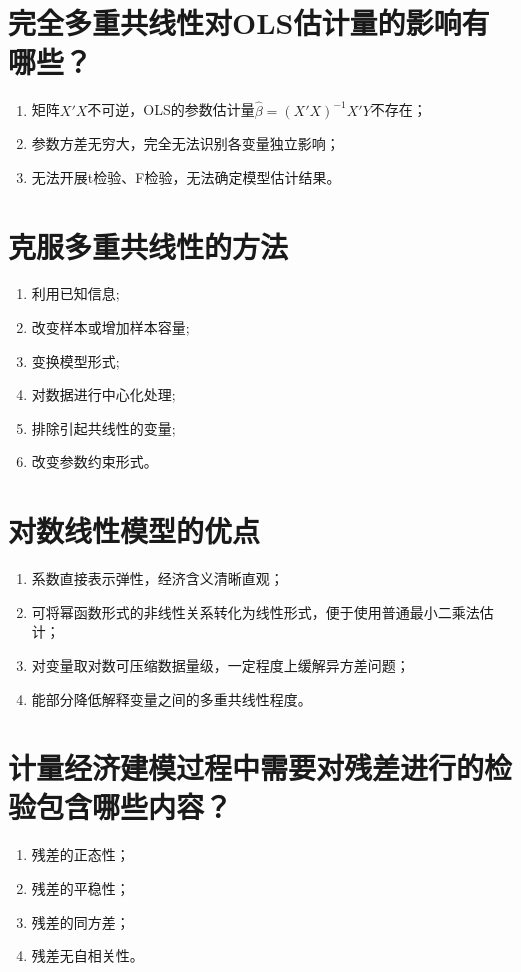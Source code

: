 \documentclass{ctexart}
\begin{document}
\section{完全多重共线性对OLS估计量的影响有哪些？}
\begin{enumerate}
\item 矩阵$X'X$不可逆，OLS的参数估计量$\hat{\beta} = (X'X)^{-1}X'Y$不存在；
\item 参数方差无穷大，完全无法识别各变量独立影响；
\item 无法开展t检验、F检验，无法确定模型估计结果。
\end{enumerate}


\section{克服多重共线性的方法}
\begin{enumerate}
\item 利用已知信息;

\item 改变样本或增加样本容量;

\item 变换模型形式;

\item 对数据进行中心化处理;

\item 排除引起共线性的变量;

\item 改变参数约束形式。
\end{enumerate}

\section{对数线性模型的优点}
\begin{enumerate}
\item 系数直接表示弹性，经济含义清晰直观；

\item 可将幂函数形式的非线性关系转化为线性形式，便于使用普通最小二乘法估计；

\item  对变量取对数可压缩数据量级，一定程度上缓解异方差问题；

\item  能部分降低解释变量之间的多重共线性程度。
\end{enumerate}

\section{计量经济建模过程中需要对残差进行的检验包含哪些内容？}
\begin{enumerate}
\item 残差的正态性；
\item 残差的平稳性；
\item 残差的同方差；
\item 残差无自相关性。
\end{enumerate}
\end{document}
